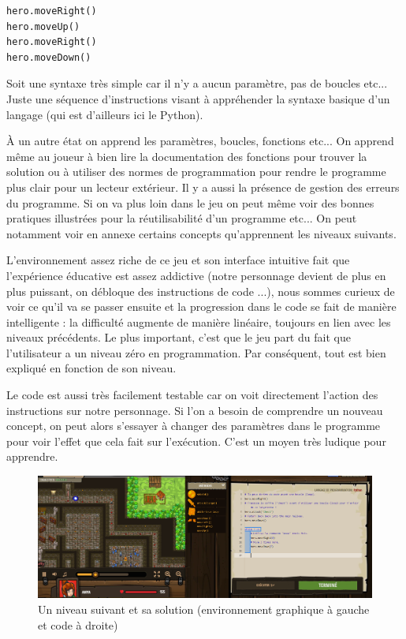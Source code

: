 \begin{lstlisting}[frame=single]
hero.moveRight()
hero.moveUp()
hero.moveRight()
hero.moveDown()
\end{lstlisting}

Soit une syntaxe très simple car il n'y a aucun paramètre, pas de boucles etc... Juste une séquence d'instructions visant à appréhender la syntaxe basique d'un langage (qui est d'ailleurs ici le Python).

\newpage

À un autre état on apprend les paramètres, boucles, fonctions etc... On apprend même au joueur à bien lire la documentation des fonctions pour trouver la solution ou à utiliser des normes de programmation pour rendre le programme plus clair pour un lecteur extérieur. Il y a aussi la présence de gestion des erreurs du programme. Si on va plus loin dans le jeu on peut même voir des bonnes pratiques illustrées pour la réutilisabilité d'un programme etc... On peut notamment voir en annexe certains concepts qu'apprennent les niveaux suivants.

L'environnement assez riche de ce jeu et son interface intuitive fait que l'expérience éducative est assez addictive (notre personnage devient de plus en plus puissant, on débloque des instructions de code ...), nous sommes curieux de voir ce qu'il va se passer ensuite et la progression dans le code se fait de manière intelligente : la difficulté augmente de manière linéaire, toujours en lien avec les niveaux précédents. Le plus important, c'est que le jeu part du fait que l'utilisateur a un niveau zéro en programmation. Par conséquent, tout est bien expliqué en fonction de son niveau.

Le code est aussi très facilement testable car on voit directement l'action des instructions sur notre personnage. Si l'on a besoin de comprendre un nouveau concept, on peut alors s'essayer à changer des paramètres dans le programme pour voir l'effet que cela fait sur l'exécution. C'est un moyen très ludique pour apprendre.

\begin{figure}[!htb]
  \centering
  \includegraphics[width=150mm,scale=0.5]{images/codecombat4.PNG}
  \caption{Un niveau suivant et sa solution (environnement graphique à gauche et code à droite)}
  \label{fig:boat1}
\end{figure}

